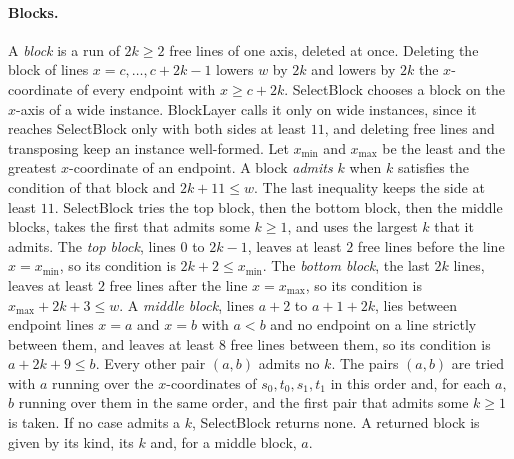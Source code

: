 \documentclass[11pt]{article}
\begin{document}
\paragraph{Blocks.} A \emph{block} is a run of $2k\ge 2$ free lines of one axis, deleted at once.
Deleting the block of lines $x=c,\ldots,c+2k-1$ lowers $w$ by $2k$ and lowers by $2k$ the
$x$-coordinate of every endpoint with $x\ge c+2k$. SelectBlock chooses a block on the $x$-axis of a
wide instance. BlockLayer calls it only on wide instances, since it reaches SelectBlock only with
both sides at least $11$, and deleting free lines and transposing keep an instance well-formed. Let $x_{\min}$ and $x_{\max}$ be the least and the greatest $x$-coordinate of
an endpoint. A block \emph{admits} $k$ when $k$ satisfies the condition of that block and $2k+11\le w$. The last
inequality keeps the side at least $11$. SelectBlock tries the top block, then the bottom block,
then the middle blocks, takes the first that admits some $k\ge 1$, and uses the largest $k$ that it
admits. The \emph{top block},
lines $0$ to $2k-1$, leaves at least $2$ free lines before the line $x=x_{\min}$, so its condition
is $2k+2\le x_{\min}$. The \emph{bottom block}, the last $2k$ lines, leaves at least $2$ free lines
after the line $x=x_{\max}$, so its condition is $x_{\max}+2k+3\le w$. A \emph{middle block}, lines
$a+2$ to $a+1+2k$, lies between endpoint lines $x=a$ and $x=b$ with $a<b$ and no endpoint on a line
strictly between them, and leaves at least $8$ free lines between them, so its condition is
$a+2k+9\le b$. Every other pair $(a,b)$ admits no $k$. The pairs $(a,b)$ are tried with $a$ running over the $x$-coordinates of
$s_0,t_0,s_1,t_1$ in this order and, for each $a$, $b$ running over them in the same order, and the
first pair that admits some $k\ge 1$ is taken. If no case admits a $k$, SelectBlock returns none. A returned block is given by its kind, its $k$
and, for a middle block, $a$.
\end{document}
